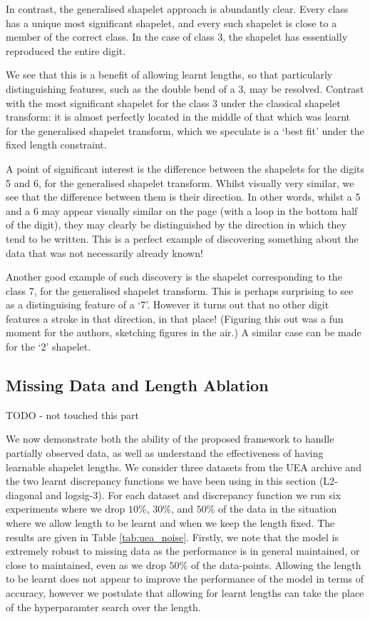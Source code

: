 \documentclass{article}
\theoremstyle{plain}
\theoremstyle{definition}
\begin{document}
In contrast, the generalised shapelet approach is abundantly clear. Every class has a unique most significant shapelet, and every such shapelet is close to a member of the correct class. In the case of class 3, the shapelet has essentially reproduced the entire digit.

We see that this is a benefit of allowing learnt lengths, so that particularly distinguishing features, such as the double bend of a 3, may be resolved. Contrast with the most significant shapelet for the class 3 under the classical shapelet transform: it is almost perfectly located in the middle of that which was learnt for the generalised shapelet transform, which we speculate is a `best fit' under the fixed length constraint.

A point of significant interest is the difference between the shapelets for the digits 5 and 6, for the generalised shapelet transform. Whilst visually very similar, we see that the difference between them is their direction. In other words, whilst a 5 and a 6 may appear visually similar on the page (with a loop in the bottom half of the digit), they may clearly be distinguished by the direction in which they tend to be written. This is a perfect example of discovering something about the data that was not necessarily already known!

Another good example of such discovery is the shapelet corresponding to the class 7, for the generalised shapelet transform. This is perhaps surprising to see as a distinguising feature of a `7'. However it turns out that no other digit features a stroke in that direction, in that place! (Figuring this out was a fun moment for the authors, sketching figures in the air.) A similar case can be made for the `2' shapelet.

\subsection{Missing Data and Length Ablation}
TODO - not touched this part

We now demonstrate both the ability of the proposed framework to handle partially observed data, as well as understand the effectiveness of having learnable shapelet lengths. We consider three datasets from the UEA archive and the two learnt discrepancy functions we have been using in this section (L2-diagonal and logsig-3). For each dataset and discrepancy function we run six experiments where we drop $10\%$, $30\%$, and $50\%$ of the data in the situation where we allow length to be learnt and when we keep the length fixed. The results are given in Table \ref{tab:uea_noise}. Firstly, we note that the model is extremely robust to missing data as the performance is in general maintained, or close to maintained, even as we drop $50\%$ of the data-points. Allowing the length to be learnt does not appear to improve the performance of the model in terms of accuracy, however we postulate that allowing for learnt lengths can take the place of the hyperparamter search over the length.
\begin{table}[ht]
    \caption{}
    \label{tab:uea_noise}
    \centering
    
\end{table}
\end{document}
